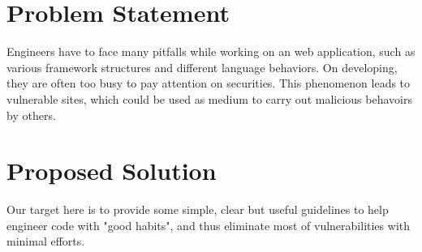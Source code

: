 \documentclass[12pt, a4paper]{article}
\begin{document}
%
%
%

\section{Problem Statement}
Engineers have to face many pitfalls while working on an web application, such as
various framework structures and different language behaviors.
On developing,
they are often too busy to pay attention on securities.
This phenomenon leads to vulnerable sites,
which could be used as medium to carry out malicious behavoirs by others.

\section{Proposed Solution}
Our target here is to provide some simple, clear but useful guidelines
to help engineer code with "good habits", and thus
eliminate most of vulnerabilities with minimal efforts.
\end{document}
